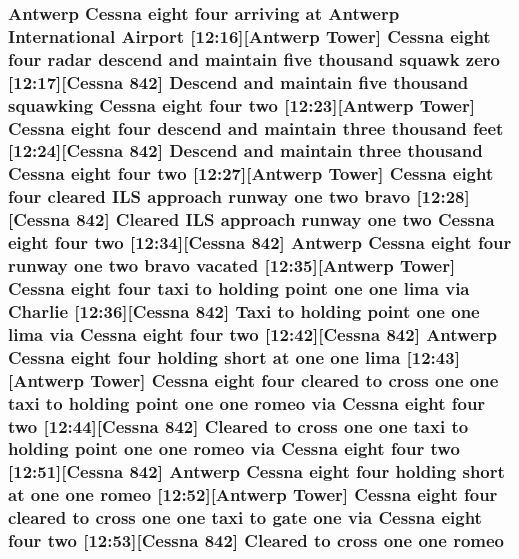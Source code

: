 \subsubsection[{\texorpdfstring{romeo}{romeo}}]{\setlength{\rightskip}{0pt plus 5cm}Antwerp {\bf Cessna} eight four arriving at Antwerp International {\bf Airport} \mbox{[}12\+:16\mbox{]}\mbox{[}Antwerp {\bf Tower}\mbox{]} {\bf Cessna} eight four radar descend and maintain five {\bf thousand} squawk {\bf zero} \mbox{[}12\+:17\mbox{]}\mbox{[}{\bf Cessna} 842\mbox{]} Descend and maintain five {\bf thousand} {\bf squawking} {\bf Cessna} eight four {\bf two} \mbox{[}12\+:23\mbox{]}\mbox{[}Antwerp {\bf Tower}\mbox{]} {\bf Cessna} eight four descend and maintain three {\bf thousand} {\bf feet} \mbox{[}12\+:24\mbox{]}\mbox{[}{\bf Cessna} 842\mbox{]} Descend and maintain three {\bf thousand} {\bf Cessna} eight four {\bf two} \mbox{[}12\+:27\mbox{]}\mbox{[}Antwerp {\bf Tower}\mbox{]} {\bf Cessna} eight four cleared I\+LS approach runway {\bf one} {\bf two} {\bf bravo} \mbox{[}12\+:28\mbox{]}\mbox{[}{\bf Cessna} 842\mbox{]} Cleared I\+LS approach runway {\bf one} {\bf two} {\bf Cessna} eight four {\bf two} \mbox{[}12\+:34\mbox{]}\mbox{[}{\bf Cessna} 842\mbox{]} Antwerp {\bf Cessna} eight four runway {\bf one} {\bf two} {\bf bravo} vacated \mbox{[}12\+:35\mbox{]}\mbox{[}Antwerp {\bf Tower}\mbox{]} {\bf Cessna} eight four taxi to holding point {\bf one} {\bf one} {\bf lima} via {\bf Charlie} \mbox{[}12\+:36\mbox{]}\mbox{[}{\bf Cessna} 842\mbox{]} Taxi to holding point {\bf one} {\bf one} {\bf lima} via {\bf Cessna} eight four {\bf two} \mbox{[}12\+:42\mbox{]}\mbox{[}{\bf Cessna} 842\mbox{]} Antwerp {\bf Cessna} eight four holding short at {\bf one} {\bf one} {\bf lima} \mbox{[}12\+:43\mbox{]}\mbox{[}Antwerp {\bf Tower}\mbox{]} {\bf Cessna} eight four cleared to cross {\bf one} {\bf one} taxi to holding point {\bf one} {\bf one} romeo via {\bf Cessna} eight four {\bf two} \mbox{[}12\+:44\mbox{]}\mbox{[}{\bf Cessna} 842\mbox{]} Cleared to cross {\bf one} {\bf one} taxi to holding point {\bf one} {\bf one} romeo via {\bf Cessna} eight four {\bf two} \mbox{[}12\+:51\mbox{]}\mbox{[}{\bf Cessna} 842\mbox{]} Antwerp {\bf Cessna} eight four holding short at {\bf one} {\bf one} romeo \mbox{[}12\+:52\mbox{]}\mbox{[}Antwerp {\bf Tower}\mbox{]} {\bf Cessna} eight four cleared to cross {\bf one} {\bf one} taxi to gate {\bf one} via {\bf Cessna} eight four {\bf two} \mbox{[}12\+:53\mbox{]}\mbox{[}{\bf Cessna} 842\mbox{]} Cleared to cross {\bf one} {\bf one} romeo}\hypertarget{happyDay3ATC_8txt_adbe0c65c6e99ae5058e64d543d533c2f}{}\label{happyDay3ATC_8txt_adbe0c65c6e99ae5058e64d543d533c2f}
